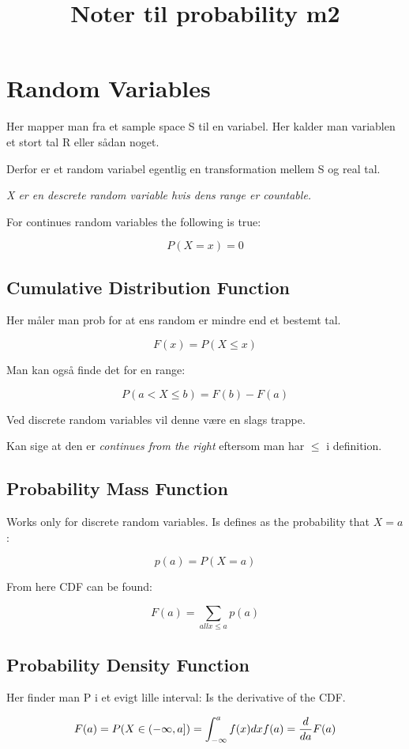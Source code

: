 \title{Noter til probability m2}

\section{Random Variables}
Her mapper man fra et sample space S til en variabel.
Her kalder man variablen et stort tal R eller sådan noget.

Derfor er et random variabel egentlig en transformation mellem S og real tal.

\emph{X er en descrete random variable hvis dens range er countable.}

For continues random variables the following is true:

$$
P(X = x) = 0
$$


\subsection{Cumulative Distribution Function}

Her måler man prob for at ens random er mindre end et bestemt tal.

$$
F(x) = P(X \leq x)
$$

Man kan også finde det for en range:

$$
P(a < X \leq b) = F(b) - F(a)
$$

Ved discrete random variables vil denne være en slags trappe.

Kan sige at den er \emph{continues from the right} eftersom man har $\leq$ i definition.

\subsection{Probability Mass Function}

Works only for discrete random variables.
Is defines as the probability that $X = a$:

$$
p(a) = P(X = a)
$$

From here CDF can be found:

$$
F(a) = \sum_{all x \leq a} p(a)
$$


\subsection{Probability Density Function}

Her finder man P i et evigt lille interval:
Is the derivative of the CDF.

$$
F(a) = P(X \in (-\infty,a]) = \int_{-\infty}^a f(x) dx \\
f(a) = \frac{d}{da} F(a)
$$

